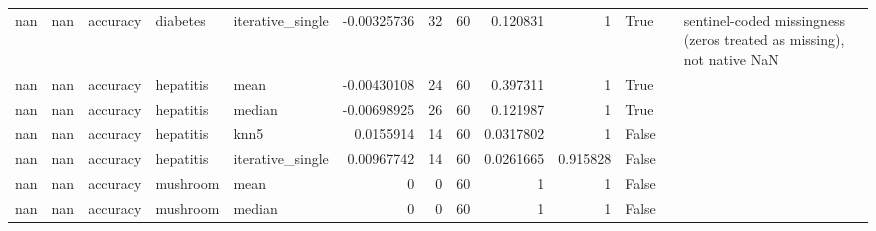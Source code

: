 \begin{table}[ht]
{\begin{tabular}{rrlllrrrrrlll}
        nan &     nan & accuracy                       & diabetes       & iterative\_single &     -0.00325736  &                  32 &      60 & 0.120831    & 1           & True               &                                                                                                                    & sentinel-coded missingness (zeros treated as missing), not native NaN \\
        nan &     nan & accuracy                       & hepatitis      & mean             &     -0.00430108  &                  24 &      60 & 0.397311    & 1           & True               &                                                                                                                    &                                                                       \\
        nan &     nan & accuracy                       & hepatitis      & median           &     -0.00698925  &                  26 &      60 & 0.121987    & 1           & True               &                                                                                                                    &                                                                       \\
        nan &     nan & accuracy                       & hepatitis      & knn5             &      0.0155914   &                  14 &      60 & 0.0317802   & 1           & False              &                                                                                                                    &                                                                       \\
        nan &     nan & accuracy                       & hepatitis      & iterative\_single &      0.00967742  &                  14 &      60 & 0.0261665   & 0.915828    & False              &                                                                                                                    &                                                                       \\
        nan &     nan & accuracy                       & mushroom       & mean             &      0           &                   0 &      60 & 1           & 1           & False              &                                                                                                                    &                                                                       \\
        nan &     nan & accuracy                       & mushroom       & median           &      0           &                   0 &      60 & 1           & 1           & False              &                                                                                                                    &                                                                       \\

\end{tabular}}
\end{table}
